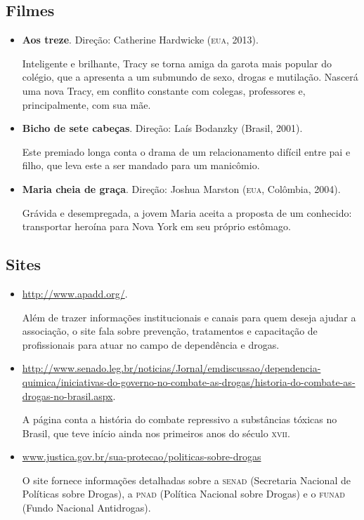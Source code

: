 \documentclass[12pt]{extarticle}
\begin{document}
\subsection{Filmes}

\begin{itemize}
\item\textbf{Aos treze}. Direção: Catherine Hardwicke (\textsc{eua}, 2013).

Inteligente e brilhante, Tracy se torna amiga da garota mais popular do
colégio, que a apresenta a um submundo de sexo, drogas e mutilação.
Nascerá uma nova Tracy, em conflito constante com colegas, professores
e, principalmente, com sua mãe.

\item\textbf{Bicho de sete cabeças}. Direção: Laís Bodanzky (Brasil, 2001).

Este premiado longa conta o drama de um relacionamento difícil entre pai
e filho, que leva este a ser mandado para um manicômio.

\item\textbf{Maria cheia de graça}. Direção: Joshua Marston (\textsc{eua}, Colômbia, 2004).

Grávida e desempregada, a jovem Maria aceita a proposta de um conhecido:
transportar heroína para Nova York em seu próprio estômago.
\end{itemize}

\subsection{Sites}

\begin{itemize}
\item\url{http://www.apadd.org/}.

Além de trazer informações institucionais e canais para quem deseja
ajudar a associação, o site fala sobre prevenção, tratamentos e
capacitação de profissionais para atuar no campo de dependência e
drogas.

\item\url{http://www.senado.leg.br/noticias/Jornal/emdiscussao/dependencia-quimica/iniciativas-do-governo-no-combate-as-drogas/historia-do-combate-as-drogas-no-brasil.aspx}.

A página conta a história do combate repressivo a substâncias tóxicas no
Brasil, que teve início ainda nos primeiros anos do século \textsc{xvii}.

\item\url{www.justica.gov.br/sua-protecao/politicas-sobre-drogas}

O site fornece informações detalhadas sobre a \textsc{senad} (Secretaria Nacional
de Políticas sobre Drogas), a \textsc{pnad} (Política Nacional sobre Drogas) e o
\textsc{funad} (Fundo Nacional Antidrogas).
\end{itemize}
\end{document}
